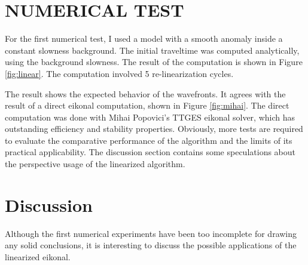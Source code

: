 \section{NUMERICAL TEST}

For the first numerical test, I used a model with a smooth anomaly
inside a constant slowness background. The initial traveltime was
computed analytically, using the background slowness. The result of
the computation is shown in Figure \ref{fig:linear}. The computation
involved 5 re-linearization cycles.



\par
The result shows the expected behavior of the wavefronts. It agrees
with the result of a direct eikonal computation, shown in Figure
\ref{fig:mihai}. The direct computation was done with Mihai
Popovici's TTGES eikonal solver, which has outstanding efficiency and
stability properties. Obviously, more tests are required to evaluate
the comparative performance of the algorithm and the limits of its
practical applicability. The discussion section contains some
speculations about the perspective usage of the linearized algorithm.

\section{Discussion}

Although the first numerical experiments have been too incomplete for
drawing any solid conclusions, it is interesting to discuss the
possible applications of the linearized eikonal.

